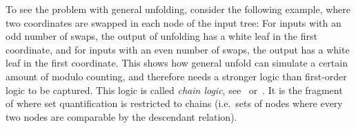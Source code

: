 

 To see the problem with general unfolding, consider the following example, where two coordinates are swapped in each node of the input tree:
For inputs with an odd number of swaps, the output of unfolding has a white leaf in the first coordinate, and for inputs with an even number of swaps, the output has a white leaf in the first coordinate. This shows how  general unfold can simulate  a certain amount of modulo counting, and therefore needs a stronger logic than first-order logic to be captured.  This logic is called \emph{chain logic},  see~\cite[Section 2]{thomas1992} or~\cite[Section 2.5.3]{bojanczykDecidablePropertiesTree2004}. It is the fragment of  \mso where set quantification is restricted to chains (i.e.~sets of nodes where every two nodes are comparable by  the descendant relation). 

